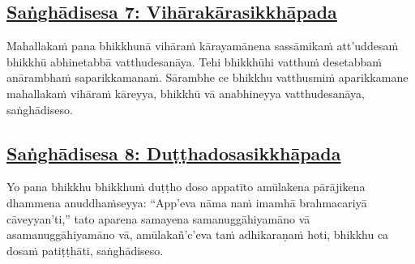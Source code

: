 \subsection*{\hyperref[comm7]{Saṅghādisesa 7: Vihārakārasikkhāpada}}
\label{sd7}

Mahallakaṁ pana\makeatletter\hyperlink{endnote55-appendix}\makeatother{} bhikkhunā vihāraṁ kārayamānena sassāmikaṁ att'uddesaṁ bhikkhū abhinetabbā vatthudesanāya. Tehi bhikkhūhi vatthuṁ\makeatletter\hyperlink{endnote56-appendix}\makeatother{} desetabbaṁ anārambhaṁ saparikkamanaṁ.\makeatletter\hyperlink{endnote57-appendix}\makeatother{} Sārambhe ce bhikkhu vatthusmiṁ aparikkamane\makeatletter\hyperlink{endnote58-appendix}\makeatother{} mahallakaṁ vihāraṁ kāreyya, bhikkhū vā anabhineyya vatthudesanāya, saṅghādiseso.



\subsection*{\hyperref[comm8]{Saṅghādisesa 8: Duṭṭhadosasikkhāpada}}
\label{sd8}

Yo pana bhikkhu bhikkhuṁ duṭṭho doso appatīto amūlakena pārājikena dhammena anuddhaṁseyya: ``App'eva nāma naṁ imamhā brahmacariyā cāveyyan'ti,'' tato aparena samayena samanuggāhiyamāno\makeatletter\hyperlink{endnote59-appendix}\makeatother{} vā asamanuggāhiyamāno\makeatletter\hyperlink{endnote60-appendix}\makeatother{} vā, amūlakañ'c'eva\makeatletter\hyperlink{endnote61-appendix}\makeatother{} taṁ adhikaraṇaṁ hoti, bhikkhu ca dosaṁ patiṭṭhāti, saṅghādiseso.



